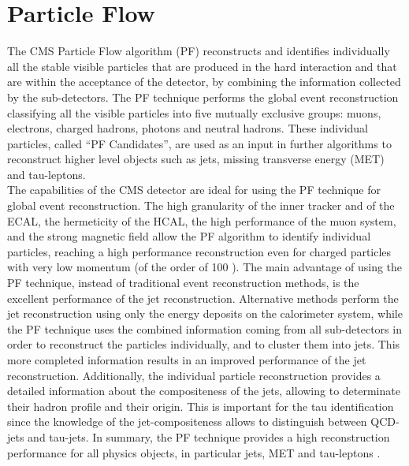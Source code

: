 
\section{Particle Flow}
\label{sec:PF}

\noindent The CMS Particle Flow algorithm (PF) reconstructs and identifies 
individually all the stable visible particles that are produced in the hard interaction
and that are within the acceptance of the detector, by combining the 
information collected by the sub-detectors. The PF technique performs the global event 
reconstruction classifying all the visible particles into five mutually exclusive groups: 
muons, electrons, charged hadrons, photons and neutral hadrons. These individual particles, called 
``PF Candidates'', are used as an input in further algorithms to reconstruct higher 
level objects such as jets, missing transverse energy (MET) and tau-leptons. \\

\noindent The capabilities of the CMS detector are ideal for using the PF technique 
for global event reconstruction. The high granularity of the inner tracker 
and of the ECAL, the hermeticity of the HCAL, the high performance of the muon
system, and the strong magnetic field allow the PF algorithm to identify individual 
particles, reaching a high performance reconstruction even for charged particles 
with very low momentum (of the order of 100 \MeV). The main advantage of using the PF 
technique, instead of traditional event reconstruction methods, is the excellent 
performance of the jet reconstruction. Alternative methods perform the jet 
reconstruction using only the energy deposits on the calorimeter system, while 
the PF technique uses the combined information coming from all sub-detectors 
in order to reconstruct the particles individually, and to cluster them into jets. This 
more completed information results in an improved performance of the jet 
reconstruction. Additionally, the individual particle reconstruction
provides a detailed information about the compositeness of the jets, allowing 
to determinate their hadron profile and their origin. This is important 
for the tau identification since the knowledge of the jet-compositeness allows to 
distinguish between QCD-jets and tau-jets. In summary, the PF technique provides a high
reconstruction performance for all physics objects, in particular jets, MET and 
tau-leptons \cite{PFAlgorithm}.\\

